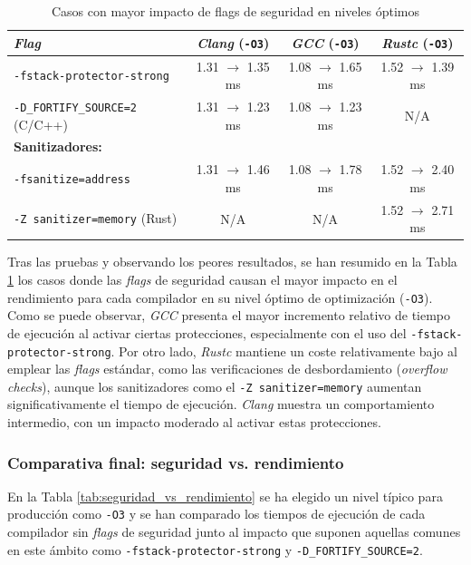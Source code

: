 \begin{table}[H]
\centering
\footnotesize
\begin{tabular}{|l|c|c|c|}
\hline
\emph{\textbf{Flag}} & \textbf{\emph{Clang} (\texttt{-O3})} & \textbf{\emph{GCC} (\texttt{-O3})} & \textbf{\emph{Rustc} (\texttt{-O3})}\\
\hline
\texttt{-fstack-protector-strong} & 1.31 $\rightarrow$ 1.35 ms & 1.08 $\rightarrow$ 1.65 ms & 1.52 $\rightarrow$ 1.39 ms\\
\texttt{-D\_FORTIFY\_SOURCE=2} (C/C++) & 1.31 $\rightarrow$ 1.23 ms & 1.08 $\rightarrow$ 1.23 ms & N/A\\
\hline
\multicolumn{4}{|l|}{\textbf{Sanitizadores:}} \\
\hline
\texttt{-fsanitize=address} & 1.31 $\rightarrow$ 1.46 ms & 1.08 $\rightarrow$ 1.78 ms & 1.52 $\rightarrow$ 2.40 ms\\
\texttt{-Z sanitizer=memory} (Rust) & N/A & N/A & 1.52 $\rightarrow$ 2.71 ms\\
\hline
\end{tabular}
\caption{Casos con mayor impacto de flags de seguridad en niveles óptimos}
\label{tab:overhead_optimos}
\end{table}

Tras las pruebas y observando los peores resultados, se han resumido en la Tabla \ref{tab:overhead_optimos} los casos donde las \emph{flags} de seguridad causan el mayor impacto en el rendimiento para cada compilador en su nivel óptimo de optimización (\texttt{-O3}). Como se puede observar, \emph{GCC} presenta el mayor incremento relativo de tiempo de ejecución al activar ciertas protecciones, especialmente con el uso del \texttt{-fstack-protector-strong}. Por otro lado, \emph{Rustc} mantiene un coste relativamente bajo al emplear las \emph{flags} estándar, como las verificaciones de desbordamiento (\emph{overflow checks}), aunque los sanitizadores como el \texttt{-Z sanitizer=memory} aumentan significativamente el tiempo de ejecución. \emph{Clang} muestra un comportamiento intermedio, con un impacto moderado al activar estas protecciones.

\subsubsection{Comparativa final: seguridad vs. rendimiento}

En la Tabla \ref{tab:seguridad_vs_rendimiento} se ha elegido un nivel típico para producción como \texttt{-O3}
y se han comparado los tiempos de ejecución de cada compilador sin \emph{flags} de seguridad junto al impacto
que suponen aquellas comunes en este ámbito como \texttt{-fstack-protector-strong} y \texttt{-D\_FORTIFY\_SOURCE=2}.


